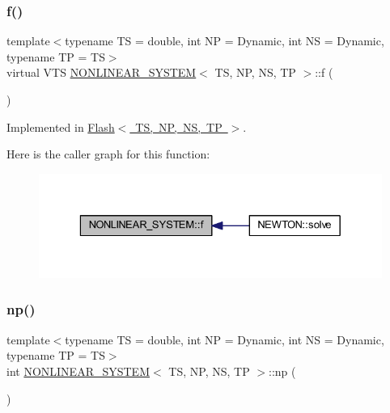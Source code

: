 \subsubsection{\texorpdfstring{f()}{f()}}
{\footnotesize\ttfamily template$<$typename TS = double, int NP = Dynamic, int NS = Dynamic, typename TP = TS$>$ \\
virtual V\+TS \mbox{\hyperlink{class_n_o_n_l_i_n_e_a_r___s_y_s_t_e_m}{N\+O\+N\+L\+I\+N\+E\+A\+R\+\_\+\+S\+Y\+S\+T\+EM}}$<$ TS, NP, NS, TP $>$\+::f (\begin{DoxyParamCaption}{ }\end{DoxyParamCaption})\hspace{0.3cm}{\ttfamily [pure virtual]}}



Implemented in \mbox{\hyperlink{class_flash_ad29e755877ca96aa5b9f34a10d6cd8b2}{Flash$<$ T\+S, N\+P, N\+S, T\+P $>$}}.

Here is the caller graph for this function\+:
\nopagebreak
\begin{figure}[H]
\begin{center}
\leavevmode
\includegraphics[width=329pt]{class_n_o_n_l_i_n_e_a_r___s_y_s_t_e_m_a65827d7df297f26cd3f14f472a212077_icgraph}
\end{center}
\end{figure}
\mbox{\label{class_n_o_n_l_i_n_e_a_r___s_y_s_t_e_m_ab5876470030832088d8ee1ed609d5311}} 
\subsubsection{\texorpdfstring{np()}{np()}}
{\footnotesize\ttfamily template$<$typename TS = double, int NP = Dynamic, int NS = Dynamic, typename TP = TS$>$ \\
int \mbox{\hyperlink{class_n_o_n_l_i_n_e_a_r___s_y_s_t_e_m}{N\+O\+N\+L\+I\+N\+E\+A\+R\+\_\+\+S\+Y\+S\+T\+EM}}$<$ TS, NP, NS, TP $>$\+::np (\begin{DoxyParamCaption}{ }\end{DoxyParamCaption})\hspace{0.3cm}{\ttfamily [inline]}}

